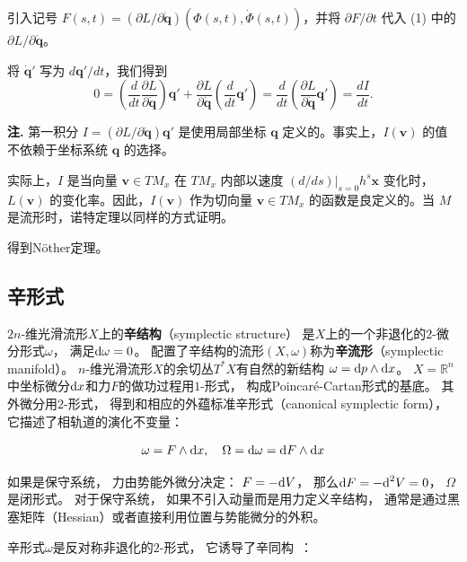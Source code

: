 ﻿\documentclass[10pt,a4paper]{article}
\numberwithin{equation}{section}
\begin{document}
引入记号 \( F(s, t) = (\partial L / \partial \dot{\mathbf{q}})(\Phi(s, t), \dot{\Phi}(s, t)) \)，并将 \( \partial F / \partial t \) 代入 (1) 中的 \( \partial L / \partial \dot{\mathbf{q}} \)。

将 \( \dot{\mathbf{q}}' \) 写为 \( d\mathbf{q}' / dt \)，我们得到
\[
0 = \left( \frac{d}{dt} \frac{\partial L}{\partial \dot{\mathbf{q}}} \right) \mathbf{q}' + \frac{\partial L}{\partial \dot{\mathbf{q}}} \left( \frac{d}{dt} \mathbf{q}' \right) = \frac{d}{dt} \left( \frac{\partial L}{\partial \dot{\mathbf{q}}} \mathbf{q}' \right) = \frac{dI}{dt}.
\]

\textbf{注.} 第一积分 \( I = (\partial L / \partial \dot{\mathbf{q}}) \mathbf{q}' \) 是使用局部坐标 \( \mathbf{q} \) 定义的。事实上，\( I(\mathbf{v}) \) 的值不依赖于坐标系统 \( \mathbf{q} \) 的选择。

实际上，\( I \) 是当向量 \( \mathbf{v} \in TM_x \) 在 \( TM_x \) 内部以速度 \( (d/ds)|_{s=0} h^s \mathbf{x} \) 变化时，\( L(\mathbf{v}) \) 的变化率。因此，\( I(\mathbf{v}) \) 作为切向量 \( \mathbf{v} \in TM_x \) 的函数是良定义的。当 \( M \) 是流形时，诺特定理以同样的方式证明。

得到Nöther定理。

\subsection{辛形式}

$2n$-维光滑流形$X$上的\textbf{辛结构}（symplectic structure）
是$X$上的一个非退化的$2$-微分形式$\omega$，
满足$\text d\omega = 0$。
配置了辛结构的流形$(X,\omega)$称为\textbf{辛流形}（symplectic manifold）。
$n$-维光滑流形$X$的余切丛$T^*X$有自然的新结构
$\omega = \text dp \wedge \text dx$。
$X = \mathbb R^n$中坐标微分$\text dx$和力$F$的做功过程用$1$-形式，
构成Poincaré-Cartan形式的基底。
其外微分用$2$-形式，
得到和相应的外蕴标准辛形式（canonical symplectic form），
它描述了相轨道的演化不变量：

\begin{equation}
\omega = F \wedge \text dx, \quad
\Omega = \text d \omega = \text d F \wedge \text dx
\label{eq:canonical-symplectic-form}
\end{equation}

如果是保守系统，
力由势能外微分决定：
$F = - \text dV$，
那么$\text d F = - \text d^2 V = 0$，
$\Omega$是闭形式。
对于保守系统，
如果不引入动量而是用力定义辛结构，
通常是通过黑塞矩阵（Hessian）或者直接利用位置与势能微分的外积。

辛形式$\omega$是反对称非退化的$2$-形式，
它诱导了辛同构~\cite{MarsdenRatiu1994}：
\end{document}
